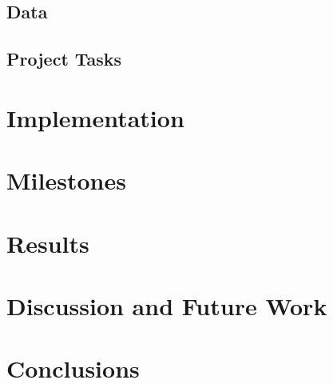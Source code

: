 \documentclass{article}
\begin{document}
\subsection{Data}


\subsection{Project Tasks}


\section{Implementation}
\label{sec:implementation}


\section{Milestones}
\label{sec:milestones}



\section{Results}
\label{sec:results}


\section{Discussion and Future Work}
\label{sec:discussion}


\section{Conclusions}
\label{sec:conlusions}

\printbibliography[heading=bibintoc, title={Bibliography}]
\end{document}
